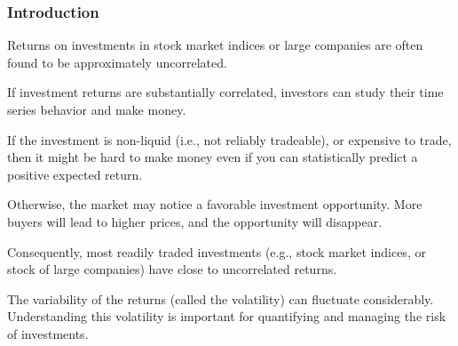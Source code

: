 \documentclass{beamer}\usepackage[]{graphicx}\usepackage[]{color}
\begin{document}
\begin{frame}[fragile]

\frametitle{Introduction}

\bi

\item Returns on investments in stock market indices or large companies are often found to be approximately uncorrelated. 

\item If investment returns are substantially correlated, investors can study their time series behavior and make money. 

\item If the investment is non-liquid (i.e., not reliably tradeable), or expensive to trade, then it might be hard to make money even if you can statistically predict a positive expected return.

\item Otherwise, the market may notice a favorable investment opportunity. More buyers will lead to higher prices, and the opportunity will disappear.

\item Consequently, most readily traded investments (e.g., stock market indices, or stock of large companies) have close to uncorrelated returns.

\item The variability of the returns (called the volatility) can fluctuate considerably. Understanding this volatility is important for quantifying and managing the risk of investments. 

\ei

\end{frame}
\end{document}
